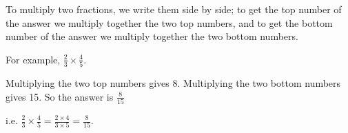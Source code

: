 To multiply two fractions, we write them side by side; 
to get the top number of the answer we multiply together the
two top numbers, and to get the bottom number of the
answer we multiply together the two bottom numbers.
\par
For example, $ \frac{2}{3} \times \frac{4}{5} . $
\par
Multiplying the two top numbers gives 8. Multiplying the
two bottom numbers gives 15. So the answer is $ \frac{8}{15} $
\par
i.e. $ \frac{2}{3} \times \frac{4}{5} = \frac{2 \times 4}{3 \times 5}
= \frac{8}{15} . $